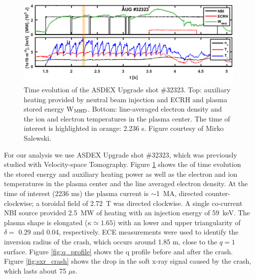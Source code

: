 \begin{figure}[h!]
    \centering
    \includegraphics[width=16cm]{figures/32323_plasma.png}
    \caption{Time evolution of the ASDEX Upgrade shot \#32323. Top: auxiliary heating provided by neutral beam injection and ECRH and plasma stored energy W$_{\rm{MHD}}$. Bottom: line-averaged electron density and the ion and electron temperatures in the plasma center. The time of interest is highlighted in orange: 2.236 s. Figure courtesy of Mirko Salewski.\cite{salewski2018deuterium}}
    \label{fig:augd_plasma}
\end{figure}
For our analysis we use ASDEX Upgrade shot \#32323, which was previously studied with Velocity-space Tomography.\cite{salewski2016high,salewski2018deuterium} Figure \ref{fig:augd_plasma} shows the of time evolution the stored energy and auxiliary heating power as well as the electron and ion temperatures in the plasma center and the line averaged electron density. At the time of interest (2236 ms) the plasma current is $\sim$1~MA, directed counter-clockwise; a toroidal field of 2.72~T was directed clockwise. A single co-current NBI source provided 2.5~MW of heating with an injection energy of 59~keV. The plasma shape is elongated ($\kappa \simeq 1.65$) with an lower and upper triangularity of $\delta = $ 0.29 and 0.04, respectively. ECE measurements were used to identify the inversion radius of the crash, which occurs around 1.85 m, close to the $q=1$ surface. Figure \ref{fig:q_profile} shows the q profile before and after the crash. Figure \ref{fig:sxr_crash} shows the drop in the soft x-ray signal caused by the crash, which lasts about 75 $\mu$s. 
